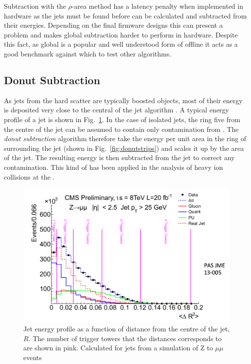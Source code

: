 Subtraction with the $\rho$-area method has a latency penalty when
implemented in hardware as the jets must be found before \rho can be
calculated and subtracted from their energies. Depending on the final
firmware designs this can present a problem and makes global \rho
subtraction harder to perform in hardware. Despite this fact, as
global \rho is a popular and well understood form of offline \PUS it
acts as a good benchmark against which to test other algorithms.

\subsection{Donut Subtraction}

As jets from the hard scatter are typically boosted objects, most of
their energy is deposited very close to the central \TT of the jet
algorithm \cite{JetProfile_pileup}. A typical energy profile of a jet
is shown in Fig.~\ref{fig:jetprofile}. In the case of isolated jets,
the ring five \TTs from the centre of the jet can be assumed to contain
only contamination from \PU.  The \emph{donut subtraction} algorithm therefore take the
energy per unit area in the ring of \TTs surrounding the jet (shown in
Fig.~\ref{fig:donutstrips}) and scales
it up by the area of the jet. The resulting energy is then subtracted
from the jet to correct any \PU contamination. This kind of \PUS has
been applied in the analysis of heavy ion collisions at the \LHC
\cite{Cacciari:2010te}.

\begin{figure}
	\begin{center}
		\includegraphics[width=0.8\linewidth]{figs/trigger/jetProfile}
  \caption{ Jet energy profile as a function of distance from the
  centre of the jet, $R$. The number of trigger towers that the
  distances corresponds to are shown in pink. Calculated for jets from
  a simulation of Z to $\mu\mu$ events \cite{JetProfile_pileup}}
	\label{fig:jetprofile}
	\end{center}
\end{figure}

